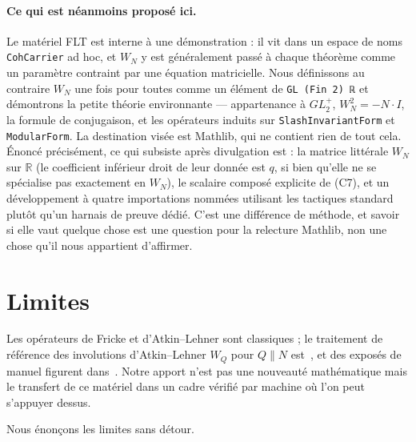 \documentclass[11pt, a4paper]{article}
\theoremstyle{remark}
\begin{document}
\paragraph{Ce qui est néanmoins proposé ici.}
Le matériel FLT est interne à une démonstration : il vit dans un espace de noms \texttt{CohCarrier}
ad hoc, et $W_N$ y est généralement passé à chaque théorème comme un paramètre contraint par une
équation matricielle. Nous définissons au contraire $W_N$ une fois pour toutes comme un élément de
\texttt{GL (Fin 2) ℝ} et démontrons la petite théorie environnante --- appartenance à $GL_2^+$,
$W_N^2 = -N\cdot I$, la formule de conjugaison, et les opérateurs induits sur
\texttt{SlashInvariantForm} et \texttt{ModularForm}. La destination visée est Mathlib, qui ne
contient rien de tout cela. Énoncé précisément, ce qui subsiste après divulgation est : la matrice
littérale $W_N$ sur $\mathbb{R}$ (le coefficient inférieur droit de leur donnée est $q$, si bien
qu'elle ne se spécialise pas exactement en $W_N$), le scalaire composé explicite de (C7), et un
développement à quatre importations nommées utilisant les tactiques standard plutôt qu'un harnais
de preuve dédié. C'est une différence de méthode, et savoir si elle vaut quelque chose est une
question pour la relecture Mathlib, non une chose qu'il nous appartient d'affirmer.

\section{Limites}

Les opérateurs de Fricke et d'Atkin--Lehner sont classiques ; le traitement de référence des
involutions d'Atkin--Lehner $W_Q$ pour $Q \| N$ est~\cite{AtkinLehner1970}, et des exposés de
manuel figurent dans~\cite{DiamondShurman2005, Miyake2006, Ono2004}. Notre apport n'est pas une
nouveauté mathématique mais le transfert de ce matériel dans un cadre vérifié par machine où l'on
peut s'appuyer dessus.

Nous énonçons les limites sans détour.
\end{document}
